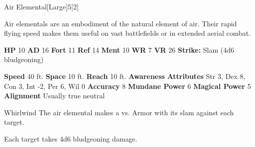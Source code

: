  \begin{monsection}{Air Elemental}[Large]{5}[2]
    \vspace{-1em}\vspace{-1em}
    \vspace{0em}

    
    Air elementals are an embodiment of the natural element of air.
    Their rapid flying speed makes them useful on vast battlefields or in extended aerial combat.
  
    

    \begin{spellcontent}
      \begin{spelltargetinginfo}
        \pari \textbf{HP} 10 \monsep
          \textbf{AD} 16 \monsep
          \textbf{Fort} 11 \monsep
          \textbf{Ref} 14 \monsep
          \textbf{Ment} 10
        \pari \textbf{WR} 7 \monsep
        \textbf{VR} 26
        \pari \textbf{Strike:}
            Slam  (4d6 bludgeoning)
      \end{spelltargetinginfo}
    \end{spellcontent}
    \begin{monsterfooter}
      \pari \textbf{Speed} 40 ft. \monsep
        \textbf{Space} 10 ft. \monsep
        \textbf{Reach} 10 ft.
      \pari \textbf{Awareness} 
      \pari \textbf{Attributes}
        Str 3, Dex 8,
        Con 3, Int -2,
        Per 6, Wil 0
      \pari \textbf{Accuracy} 8 \monsep
        \textbf{Mundane Power} 6 \monsep
      \textbf{Magical Power} 5
      \pari \textbf{Alignment} Usually true neutral
    \end{monsterfooter}
  \end{monsection}
  \begin{freeability}{Whirlwind}
       The air elemental makes a 
         vs. Armor
        with its slam against each target.
    
    \hit Each target takes 4d6 bludgeoning damage.
    \end{freeability}
  
